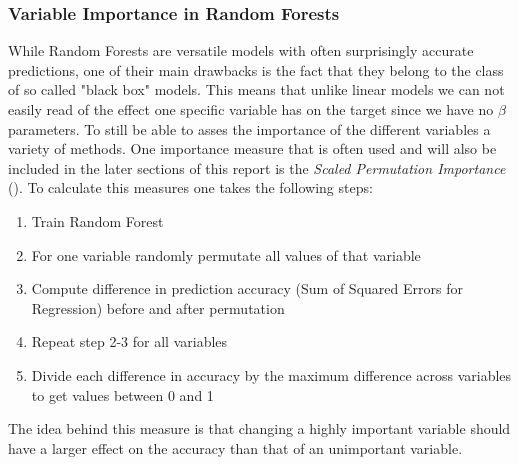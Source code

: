 \subsubsection{Variable Importance in Random Forests}
While Random Forests are versatile models with often surprisingly accurate predictions, one of their main drawbacks is the fact that they belong to the class of so called "black box" models. This means that unlike linear models we can not easily read of the effect one specific variable has on the target since we have no $\beta$ parameters.
To still be able to asses the importance of the different variables a variety of methods. One importance measure that is often used and will also be included in the later sections of this report is the \textit{Scaled Permutation Importance} (\cite{liaw_classification_2002}). To calculate this measures one takes the following steps:
\begin{enumerate}
\item Train Random Forest
\item For one variable randomly permutate all values of that variable
\item Compute difference in prediction accuracy (Sum of Squared Errors for Regression) before and after permutation
\item Repeat step 2-3 for all variables
\item Divide each difference in accuracy by the maximum difference across variables to get values between 0  and 1
\end{enumerate}
The idea behind this measure is that changing a highly important variable should have a larger effect on the accuracy than that of an unimportant variable.